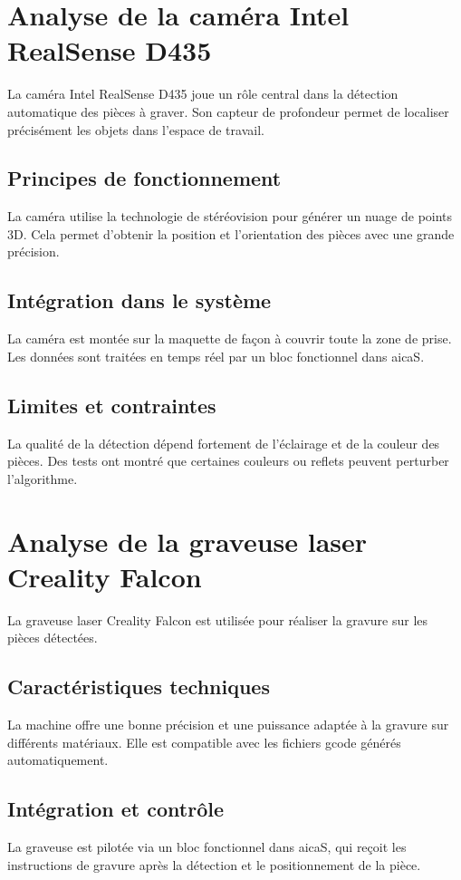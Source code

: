 \section{Analyse de la caméra Intel RealSense D435}
La caméra Intel RealSense D435 joue un rôle central dans la détection automatique des pièces à graver. Son capteur de profondeur permet de localiser précisément les objets dans l’espace de travail.
\subsection{Principes de fonctionnement}
La caméra utilise la technologie de stéréovision pour générer un nuage de points 3D. Cela permet d’obtenir la position et l’orientation des pièces avec une grande précision.
\subsection{Intégration dans le système}
La caméra est montée sur la maquette de façon à couvrir toute la zone de prise. Les données sont traitées en temps réel par un bloc fonctionnel dans \gls{aicaS}.
\subsection{Limites et contraintes}
La qualité de la détection dépend fortement de l’éclairage et de la couleur des pièces. Des tests ont montré que certaines couleurs ou reflets peuvent perturber l’algorithme.

\section{Analyse de la graveuse laser Creality Falcon}
La graveuse laser Creality Falcon est utilisée pour réaliser la gravure sur les pièces détectées.
\subsection{Caractéristiques techniques}
La machine offre une bonne précision et une puissance adaptée à la gravure sur différents matériaux. Elle est compatible avec les fichiers \gls{gcode} générés automatiquement.
\subsection{Intégration et contrôle}
La graveuse est pilotée via un bloc fonctionnel dans \gls{aicaS}, qui reçoit les instructions de gravure après la détection et le positionnement de la pièce.
